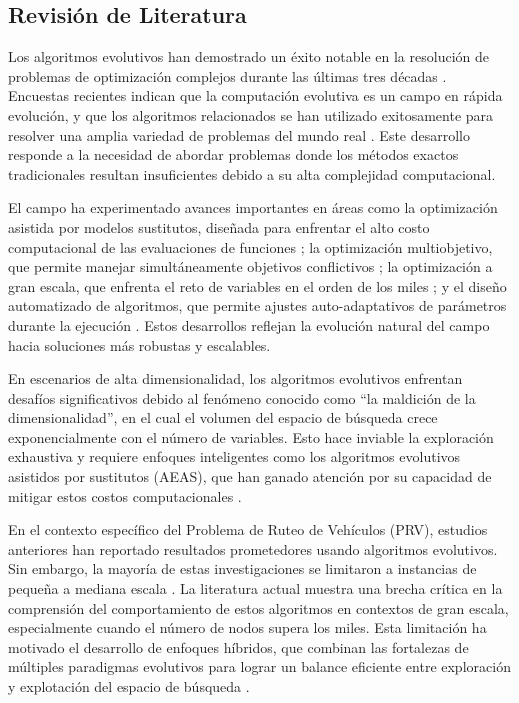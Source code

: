\documentclass[10pt,a4paper]{article}
\begin{document}
\begin{multicols}{2}
\section{Revisión de Literatura}

Los algoritmos evolutivos han demostrado un éxito notable en la resolución de problemas de optimización complejos durante las últimas tres décadas \cite{fogel2006,back2013}. Encuestas recientes indican que la computación evolutiva es un campo en rápida evolución, y que los algoritmos relacionados se han utilizado exitosamente para resolver una amplia variedad de problemas del mundo real \cite{yang2013}. Este desarrollo responde a la necesidad de abordar problemas donde los métodos exactos tradicionales resultan insuficientes debido a su alta complejidad computacional.

El campo ha experimentado avances importantes en áreas como la optimización asistida por modelos sustitutos, diseñada para enfrentar el alto costo computacional de las evaluaciones de funciones \cite{jin2011}; la optimización multiobjetivo, que permite manejar simultáneamente objetivos conflictivos \cite{coello2007,zhang2008}; la optimización a gran escala, que enfrenta el reto de variables en el orden de los miles \cite{lozano2011}; y el diseño automatizado de algoritmos, que permite ajustes auto-adaptativos de parámetros durante la ejecución \cite{brest2006}. Estos desarrollos reflejan la evolución natural del campo hacia soluciones más robustas y escalables.

En escenarios de alta dimensionalidad, los algoritmos evolutivos enfrentan desafíos significativos debido al fenómeno conocido como ``la maldición de la dimensionalidad'', en el cual el volumen del espacio de búsqueda crece exponencialmente con el número de variables. Esto hace inviable la exploración exhaustiva y requiere enfoques inteligentes como los algoritmos evolutivos asistidos por sustitutos (AEAS), que han ganado atención por su capacidad de mitigar estos costos computacionales \cite{wang2018}.

En el contexto específico del Problema de Ruteo de Vehículos (PRV), estudios anteriores han reportado resultados prometedores usando algoritmos evolutivos. Sin embargo, la mayoría de estas investigaciones se limitaron a instancias de pequeña a mediana escala \cite{rego2011}. La literatura actual muestra una brecha crítica en la comprensión del comportamiento de estos algoritmos en contextos de gran escala, especialmente cuando el número de nodos supera los miles. Esta limitación ha motivado el desarrollo de enfoques híbridos, que combinan las fortalezas de múltiples paradigmas evolutivos para lograr un balance eficiente entre exploración y explotación del espacio de búsqueda \cite{potter2000}.



\end{multicols}
\end{document}
